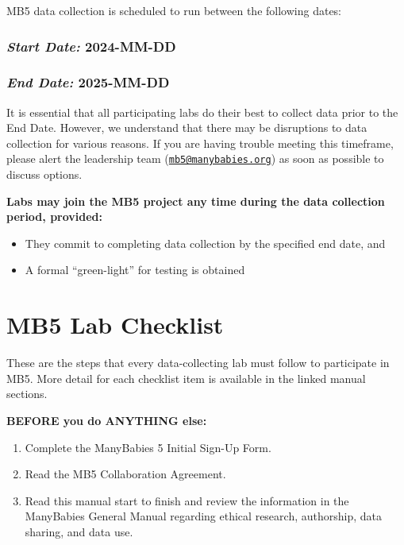 \documentclass[
]{book}
\providecommand{\tightlist}{%
  \setlength{\itemsep}{0pt}\setlength{\parskip}{0pt}}
\begin{document}
MB5 data collection is scheduled to run between the following dates:

\subsubsection*{\texorpdfstring{\emph{Start Date:} \textbf{2024-MM-DD}}{Start Date: 2024-MM-DD}}\label{start-date-2024-mm-dd}

\subsubsection*{\texorpdfstring{\emph{End Date:} \textbf{2025-MM-DD}}{End Date: 2025-MM-DD}}\label{end-date-2025-mm-dd}

It is essential that all participating labs do their best to collect data prior to the End Date. However, we understand that there may be disruptions to data collection for various reasons. If you are having trouble meeting this timeframe, please alert the leadership team (\href{mailto:mb5@manybabies.org}{\nolinkurl{mb5@manybabies.org}}) as soon as possible to discuss options.

\textbf{Labs may join the MB5 project any time during the data collection period, provided:}

\begin{itemize}
\tightlist
\item
  They commit to completing data collection by the specified end date, and
\item
  A formal ``green-light'' for testing is obtained
\end{itemize}

\section*{MB5 Lab Checklist}\label{mb5-lab-checklist}

These are the steps that every data-collecting lab must follow to participate in MB5. More detail for each checklist item is available in the linked manual sections.

\textbf{BEFORE you do ANYTHING else:}

\begin{enumerate}
\def\labelenumi{\arabic{enumi}.}
\tightlist
\item
  Complete the ManyBabies 5 Initial Sign-Up Form.
\item
  Read the MB5 Collaboration Agreement.
\item
  Read this manual start to finish and review the information in the ManyBabies General Manual regarding ethical research, authorship, data sharing, and data use.
\end{enumerate}
\end{document}
